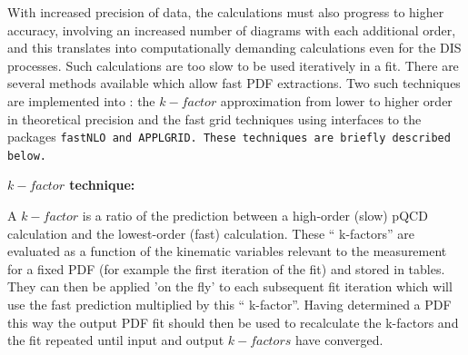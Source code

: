 
With increased precision of data, the calculations must also progress to higher accuracy, involving an increased number of diagrams with each 
additional order, and this translates into computationally demanding 
calculations even for the DIS processes. Such calculations 
are too slow to be used iteratively in a fit.
There are several methods available which allow fast PDF extractions.  
Two such techniques
are implemented into \fitter: the $k-factor$ approximation from lower to higher order in theoretical precision and the fast grid techniques using interfaces to the 
packages \tt fastNLO \rm and APPLGRID. These techniques are briefly described below.  


\begin{description}
\item \bf {$k-factor$ technique:}\rm

A $k-factor$ is a ratio of the prediction between a high-order (slow)
pQCD calculation and the lowest-order (fast) calculation.  These `` k-factors''
are evaluated as a function of the kinematic variables relevant to
 the measurement 
for a fixed PDF (for example the first iteration of the fit) and stored in 
tables. They can then be applied 'on the fly' to each subsequent fit 
iteration which will use the fast prediction multiplied by this `` k-factor''.
Having determined a PDF this way the output PDF fit should then be used to 
recalculate the k-factors and the fit repeated until input and output 
$k-factors$ have converged. 


\end{description}
